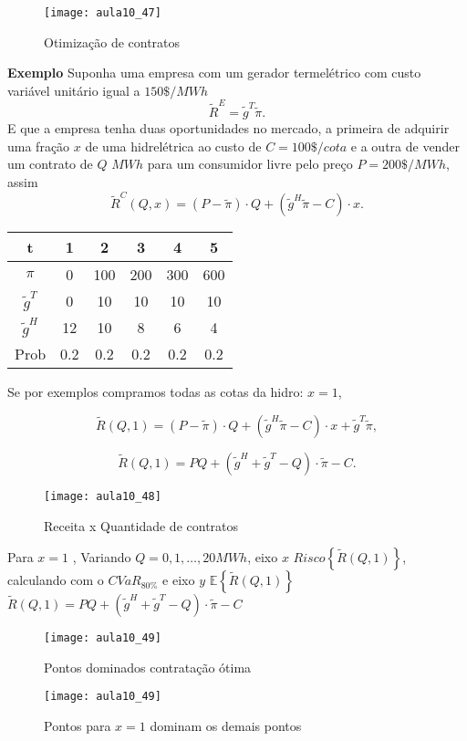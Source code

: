 \begin{figure}[H]
\begin{centering}
\texttt{[image: aula10\_47]}\protect\caption{\label{fig:aula10_47}Otimização de contratos}
\end{centering}
\end{figure}

\textbf{Exemplo}
Suponha uma empresa com um gerador termelétrico com custo variável unitário igual a $150\ensuremath{\$/MWh}$
\[
\tilde{R}^{E}=\tilde{g}^{T}\tilde{\pi}.
\]
E que a empresa tenha duas oportunidades no mercado, a primeira de adquirir uma fração $x$ de uma hidrelétrica ao custo de $C=100\$/cota$ e a outra de vender um contrato de $Q$ $MWh$ para um consumidor livre pelo preço $P=200\$/MWh$, assim
\[
\tilde{R}^{C}(Q,x)=(P-\tilde{\pi})\cdot Q+(\tilde{g}^{H}\tilde{\pi}-C)\cdot x.
\]


\begin{tabular}{|c|c|c|c|c|c|}
\hline 
t & 1 & 2 & 3 & 4 & 5\tabularnewline
\hline 
\hline 
$\pi$ & 0 & 100 & 200 & 300 & 600\tabularnewline
\hline 
$\tilde{g}^{T}$ & 0 & 10 & 10 & 10 & 10\tabularnewline
\hline 
$\tilde{g}^{H}$ & 12 & 10 & 8 & 6 & 4\tabularnewline
\hline 
Prob & 0.2 & 0.2 & 0.2 & 0.2 & 0.2\tabularnewline
\hline 
\end{tabular}

Se por exemplos  compramos todas as cotas da hidro: $x=1$,

\[
\tilde{R}(Q,1)=(P-\tilde{\pi})\cdot Q+(\tilde{g}^{H}\tilde{\pi}-C)\cdot x+\tilde{g}^{T}\tilde{\pi},
\]


\[
\tilde{R}(Q,1)=PQ+(\tilde{g}^{H}+\tilde{g}^{T}-Q)\cdot\tilde{\pi}-C.
\]

\begin{figure}[H]
\begin{centering}
\texttt{[image: aula10\_48]}\protect\caption{\label{fig:aula10_48} Receita x Quantidade de contratos}
\end{centering}
\end{figure}


Para $x=1$ ,
Variando $Q=0,1,\ldots,20MWh$, eixo $x$ $Risco\left\{ \tilde{R}(Q,1)\right\} $, calculando com o $CVaR_{80\%}$ e eixo $y$ $\mathbb{E}\left\{ \tilde{R}(Q,1)\right\} $
$\tilde{R}(Q,1)=PQ+(\tilde{g}^{H}+\tilde{g}^{T}-Q)\cdot\tilde{\pi}-C$

\begin{figure}[H]
\begin{centering}
\texttt{[image: aula10\_49]}\protect\caption{\label{fig:aula10_49} Pontos dominados contratação ótima}
\end{centering}
\end{figure}

\begin{figure}[H]
\begin{centering}
\texttt{[image: aula10\_49]}\protect\caption{\label{fig:aula10_49} Pontos para $x=1$ dominam os demais pontos}
\end{centering}
\end{figure}


